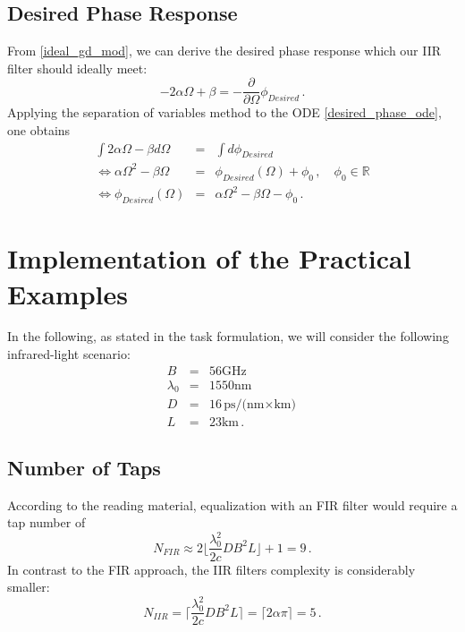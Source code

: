 \documentclass[paper=a4, fontsize=11pt]{scrartcl} %
\numberwithin{equation}{section} %
\numberwithin{figure}{section} %
\numberwithin{table}{section} %
\begin{document}
\subsection{Desired Phase Response}

From \eqref{ideal_gd_mod}, we can derive the desired phase response which our IIR filter should ideally meet:
\begin{equation} 
-2\alpha\Omega+\beta=-\frac{\partial}{\partial\Omega}\phi_{Desired}\label{desired_phase_ode}\, .
\end{equation}
Applying the separation of variables method to the ODE \eqref{desired_phase_ode}, one obtains
\begin{eqnarray}
\int2\alpha\Omega-\beta d\Omega&=&\int d\phi_{Desired}\nonumber\\
\iff\alpha\Omega^2-\beta\Omega&=&\phi_{Desired}(\Omega)+\phi_0\, , \quad \phi_0 \in \mathbb{R}\nonumber\\
\iff\phi_{Desired}(\Omega)&=&\alpha\Omega^2-\beta\Omega-\phi_0\label{ode_sep}\, .
\end{eqnarray}


\section{Implementation of the Practical Examples}

In the following, as stated in the task formulation, we will consider the following infrared-light scenario:
\begin{eqnarray}
B&=&56 \text{GHz}\nonumber\\
\lambda_0&=&1550 \text{nm}\nonumber\\
D&=&16 \text{ps/(nm$\times$km)}\label{parameters}\\
L&=&23 \text{km}\nonumber \, .
\end{eqnarray}

\subsection{Number of Taps}

According to the reading material, equalization with an FIR filter would require a tap number of
\begin{equation} 
N_{FIR}\approx2\Bigg\lfloor\frac{\lambda_0^2}{2c}DB^2L\Bigg\rfloor+1=9\label{nfir}\, .
\end{equation}
In contrast to the FIR approach, the IIR filters complexity is considerably smaller:
\begin{equation} 
N_{IIR}=\Bigg\lceil\frac{\lambda_0^2}{2c}DB^2L\Bigg\rceil=\lceil2\alpha\pi\rceil\label{niir}=5\, .
\end{equation}
\end{document}
